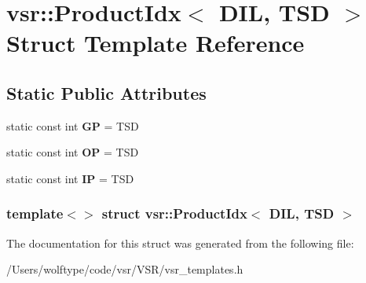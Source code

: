 \hypertarget{structvsr_1_1_product_idx_3_01_d_i_l_00_01_t_s_d_01_4}{\section{vsr\-:\-:Product\-Idx$<$ D\-I\-L, T\-S\-D $>$ Struct Template Reference}
\label{structvsr_1_1_product_idx_3_01_d_i_l_00_01_t_s_d_01_4}
}
\subsection*{Static Public Attributes}
\begin{DoxyCompactItemize}
\item 
\hypertarget{structvsr_1_1_product_idx_3_01_d_i_l_00_01_t_s_d_01_4_aee94e8ac6c4edb74e6d0feef14ac6eca}{static const int {\bfseries G\-P} = T\-S\-D}\label{structvsr_1_1_product_idx_3_01_d_i_l_00_01_t_s_d_01_4_aee94e8ac6c4edb74e6d0feef14ac6eca}

\item 
\hypertarget{structvsr_1_1_product_idx_3_01_d_i_l_00_01_t_s_d_01_4_aff0a6935883a0ef535c99e8f3309dd02}{static const int {\bfseries O\-P} = T\-S\-D}\label{structvsr_1_1_product_idx_3_01_d_i_l_00_01_t_s_d_01_4_aff0a6935883a0ef535c99e8f3309dd02}

\item 
\hypertarget{structvsr_1_1_product_idx_3_01_d_i_l_00_01_t_s_d_01_4_a22d51e737c83fd0873e9dfbd64e6009e}{static const int {\bfseries I\-P} = T\-S\-D}\label{structvsr_1_1_product_idx_3_01_d_i_l_00_01_t_s_d_01_4_a22d51e737c83fd0873e9dfbd64e6009e}

\end{DoxyCompactItemize}
\subsubsection*{template$<$$>$ struct vsr\-::\-Product\-Idx$<$ D\-I\-L, T\-S\-D $>$}



The documentation for this struct was generated from the following file\-:\begin{DoxyCompactItemize}
\item 
/\-Users/wolftype/code/vsr/\-V\-S\-R/vsr\-\_\-templates.\-h\end{DoxyCompactItemize}
